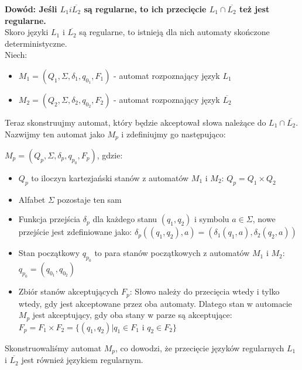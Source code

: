 \documentclass{article}
\begin{document}
\textbf{Dowód: Jeśli $L_1 i \overline{L_2}$ są regularne, to ich przecięcie $L_1 \cap \overline{L_2}$ też jest regularne.} \\
Skoro języki $L_1$ i $\overline{L_2}$ są regularne, to istnieją dla nich automaty skończone deterministyczne. \\
Niech:
\begin{itemize}
    \item $M_1 = (Q_1, \Sigma, \delta_1, q_{0_1}, F_1)$ - automat rozpoznający język $L_1$
    \item $M_2 = (Q_2, \Sigma, \delta_2, q_{0_2}, F_2)$ - automat rozpoznający język $\overline{L_2}$
\end{itemize}
Teraz skonstruujmy automat, który będzie akceptował słowa należące do $L_1 \cap \overline{L_2}$. \\
Nazwijmy ten automat jako $M_p$ i zdefiniujmy go następująco:
\begin{center}
    $M_p = (Q_p, \Sigma, \delta_p, q_{p_0}, F_p)$, gdzie:
\end{center}
\begin{itemize}
    \item $Q_p$ to iloczyn kartezjański stanów z automatów $M_1$ i $M_2$: $Q_p = Q_1 \times Q_2$
    \item Alfabet $\Sigma$ pozostaje ten sam
    \item Funkcja przejścia $\delta_p$ dla każdego stanu $(q_1, q_2)$ i symbolu $a \in \Sigma$, nowe przejście jest zdefiniowane jako: $\delta_p((q_1, q_2), a) = (\delta_1(q_1, a), \delta_2(q_2, a))$
    \item Stan początkowy $q_{p_0}$ to para stanów początkowych z automatów $M_1$ i $M_2$: $q_{p_0} = (q_{0_1}, q_{0_2})$
    \item Zbiór stanów akceptujących $F_p$: Słowo należy do przecięcia wtedy i tylko wtedy, gdy jest akceptowane przez oba automaty. Dlatego stan w automacie $M_p$ jest akceptujący, gdy oba stany w parze są akceptujące: $F_p = F_1 \times F_2 = \{(q_1, q_2) | q_1 \in F_1 \text{ i } q_2 \in F_2\}$ 
\end{itemize}
Skonstruowaliśmy automat $M_p$, co dowodzi, że przecięcie języków regularnych $L_1$ i $\overline{L_2}$ jest również językiem regularnym. \\
\end{document}
